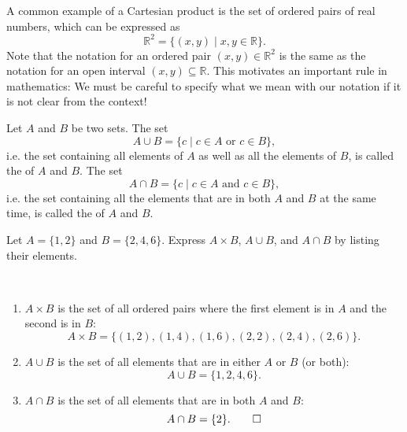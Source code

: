 A common example of a Cartesian product is the set of ordered pairs of real numbers, which can be expressed as
\begin{equation*}
    \mathbb{R}^2=\{(x,y)\mid x,y\in\mathbb{R}\}.
\end{equation*}
Note that the notation for an ordered pair $ (x,y)\in\mathbb{R}^2 $ is the same as the notation for an open interval $ (x,y)\subseteq\mathbb{R} $. This motivates an important rule in mathematics: We must be careful to specify what we mean with our notation if it is not clear from the context!

\begin{defn}
Let $ A $ and $ B $ be two sets. The set
\begin{equation*}
    A\cup B=\{c\mid c\in A\text{ or }c\in B\},
\end{equation*}
i.e. the set containing all elements of $ A $ as well as all the elements of $ B $, is called the  of $ A $ and $ B $. The set
\begin{equation*}
    A\cap B=\{c\mid c\in A\text{ and }c\in B\},
\end{equation*}
i.e. the set containing all the elements that are in both $ A $ and $ B $ at the same time, is called the  of $ A $ and $ B $.
\end{defn}

\begin{exmp}
Let $ A=\{1,2\} $ and $ B=\{2,4,6\} $. Express $ A\times B $, $ A\cup B $, and $ A\cap B $ by listing their elements.
\end{exmp}
\begin{sltn}~
\begin{enumerate}
    \item $ A\times B $ is the set of all ordered pairs where the first element is in $ A $ and the second is in $ B $:
    \begin{equation*}
        A\times B=\{(1,2),(1,4),(1,6),(2,2),(2,4),(2,6)\}.
    \end{equation*}
    \item $ A\cup B $ is the set of all elements that are in either $ A $ or $ B $ (or both):
    \begin{equation*}
        A\cup B=\{1,2,4,6\}.
    \end{equation*}
    \item $ A\cap B $ is the set of all elements that are in both $ A $ and $ B $:
    \begin{equation*}
        A\cap B=\{2\}. \qedhere
    \end{equation*}
\end{enumerate}
\end{sltn}


